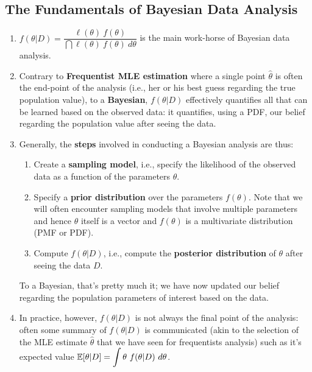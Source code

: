 \subsection{The Fundamentals of Bayesian Data Analysis}

\begin{enumerate}
    \item $f (\theta|D) = \dfrac{\ell(\theta)\ f (\theta)}{\dint \ell(\theta)\ f (\theta)\ d\theta}$ 
    is the main work-horse of Bayesian data analysis. 
    \hfill \cite{statistics/book/Statistics-for-Data-Scientists/Maurits-Kaptein}

    \item Contrary to \textbf{Frequentist MLE estimation} where a single point $\hat{\theta}$ is often the end-point of the analysis (i.e., her or his best guess regarding the true population value), 
    to a \textbf{Bayesian}, $f (\theta|D)$ effectively quantifies all that can be learned based on the observed data: it quantifies, using a PDF, our belief regarding the population value after seeing the data.
    \hfill \cite{statistics/book/Statistics-for-Data-Scientists/Maurits-Kaptein}

    \item  Generally, the \textbf{steps} involved in conducting a Bayesian analysis are thus:
    \hfill \cite{statistics/book/Statistics-for-Data-Scientists/Maurits-Kaptein}
    \begin{enumerate}
        \item Create a \textbf{sampling model}, i.e., specify the likelihood of the observed data as a function of the parameters $\theta$.
        \hfill \cite{statistics/book/Statistics-for-Data-Scientists/Maurits-Kaptein}

        \item Specify a \textbf{prior distribution} over the parameters $f (\theta)$. 
        Note that we will often encounter sampling models that involve multiple parameters and hence $\theta$ itself is a vector and $f (\theta)$ is a multivariate distribution (PMF or PDF).
        \hfill \cite{statistics/book/Statistics-for-Data-Scientists/Maurits-Kaptein}

        \item Compute $f (\theta|D)$, i.e., compute the \textbf{posterior distribution} of $\theta$ after seeing the data $D$.
        \hfill \cite{statistics/book/Statistics-for-Data-Scientists/Maurits-Kaptein}
    \end{enumerate}
    To a Bayesian, that’s pretty much it; we have now updated our belief regarding the population parameters of interest based on the data. 
    \hfill \cite{statistics/book/Statistics-for-Data-Scientists/Maurits-Kaptein}

    \item In practice, however, $f (\theta|D)$ is not always the final point of the analysis: often some summary of $f (\theta|D)$ is communicated (akin to the selection of the MLE estimate $\hat{\theta}$ that we have seen for frequentists analysis) such as it’s expected value $\mbbE[\theta|D] = \dint \theta\ f (\theta|D)\ d\theta$. 
    \hfill \cite{statistics/book/Statistics-for-Data-Scientists/Maurits-Kaptein}
\end{enumerate}


